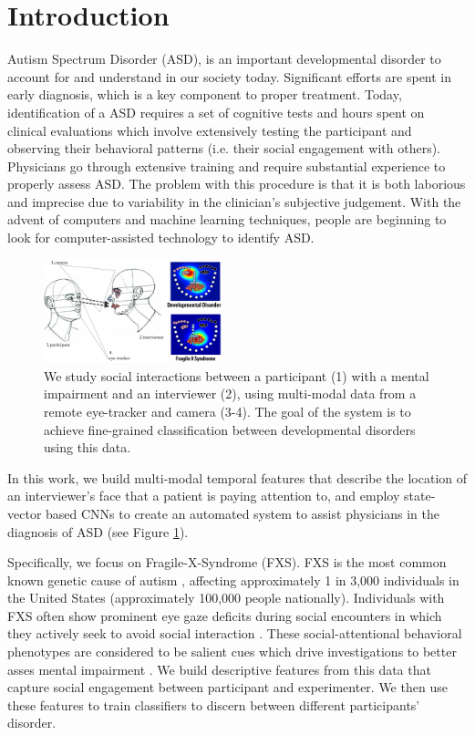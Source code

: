 \documentclass[10pt,twocolumn,letterpaper]{article}
\begin{document}
\section{Introduction}
   
Autism Spectrum Disorder (ASD), is an important developmental disorder to account for and understand in our society today. Significant efforts are spent in early diagnosis, which is a key component to proper treatment.  Today, identification of a ASD requires a set of cognitive tests and hours spent on clinical evaluations which involve extensively testing the participant and observing their behavioral patterns (i.e. their social engagement with others). Physicians go through extensive training and require substantial experience to properly assess ASD.  The problem with this procedure is that it is both laborious and imprecise due to variability in the clinician's subjective judgement. With the advent of computers and machine learning techniques, people are beginning to look for computer-assisted technology to identify ASD. 

\begin{figure}[ht]   
\centering
\includegraphics[width=0.46\textwidth]{figures/pull.png}
\caption{We study social interactions between a participant (1) with a mental impairment and an interviewer (2), using multi-modal data from a remote eye-tracker and camera (3-4). The goal of the system is to achieve fine-grained classification between developmental disorders using this data.}
\label{fig:pull_figure}
\end{figure} 

In this work, we build multi-modal temporal features that describe the location of an interviewer's face that a patient is paying attention to, and employ state-vector based CNNs to create an automated system to assist physicians in the diagnosis of ASD (see Figure \ref{fig:pull_figure}). 

Specifically, we focus on Fragile-X-Syndrome (FXS). FXS is the most common known genetic cause of autism \cite{Hagerman:2008wg}, affecting approximately 1 in 3,000 individuals in the United States (approximately 100,000 people nationally). Individuals with FXS often show prominent eye gaze deficits during social encounters in which they actively seek to avoid social interaction \cite{Cohen:1988vx,Cohen:1989cm}. These social-attentional behavioral phenotypes are considered to be salient cues which drive investigations to better asses mental impairment \cite{Kennedy:2001dg}. We build descriptive features from this data that capture social engagement between participant and experimenter. We then use these features to train classifiers to discern between different participants' disorder. 
\end{document}
